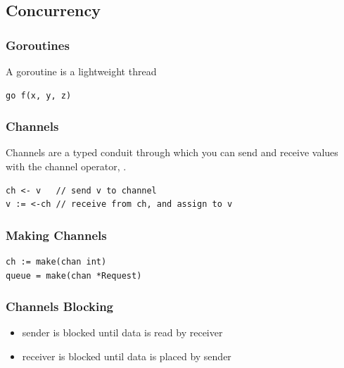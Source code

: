 \documentclass[xetex,mathserif,serif,12pt]{beamer}
\begin{document}
\subsection{Concurrency}

\begin{frame}[fragile]
  \frametitle{Goroutines}

  A goroutine is a lightweight thread 
  \newline

  \begin{beamer@nomargin}
    \begin{lstlisting}
go f(x, y, z)
    \end{lstlisting}
  \end{beamer@nomargin}

\end{frame}

\begin{frame}[fragile]
  \frametitle{Channels}

  Channels are a typed conduit through which you can send and receive values
  with the channel operator, \hltexttt{<-}.\newline

  \begin{beamer@nomargin}
    \begin{lstlisting}
ch <- v   // send v to channel
v := <-ch // receive from ch, and assign to v
    \end{lstlisting}
  \end{beamer@nomargin}
\end{frame}

\begin{frame}[fragile]
  \frametitle{Making Channels}
  \begin{beamer@nomargin}
    \begin{lstlisting}
ch := make(chan int)
queue = make(chan *Request)
    \end{lstlisting}
  \end{beamer@nomargin}
\end{frame}

\begin{frame}
  \frametitle{Channels Blocking}

  \begin{itemize}
  \item sender is blocked until data is read by receiver
  \item receiver is blocked until data is placed by sender
  \end{itemize}
\end{frame}
\end{document}

